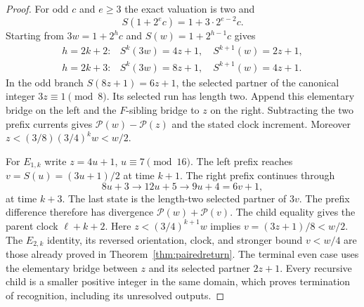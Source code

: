 \documentclass[11pt]{article}
\begin{document}
\begin{proof}
For odd $c$ and $e\ge3$ the exact valuation is two and
\[
S(1+2^ec)=1+3\cdot2^{e-2}c.
\]
Starting from $3w=1+2^h c$ and $S(w)=1+2^{h-1}c$ gives
\[
\begin{array}{ll}
h=2k+2:& S^k(3w)=4z+1,\quad S^{k+1}(w)=2z+1,\\
h=2k+3:& S^k(3w)=8z+1,\quad S^{k+1}(w)=4z+1.
\end{array}
\]
In the odd branch $S(8z+1)=6z+1$, the selected partner of the
canonical integer $3z\equiv1\pmod8$. Its selected run has length
two. Append this elementary bridge on the left and the $F$-sibling
bridge to $z$ on the right. Subtracting the two prefix currents gives
$\mathcal P(w)-\mathcal P(z)$ and the stated clock increment.
Moreover
$z<(3/8)(3/4)^k w<w/2$.

For $E_{1,k}$ write $z=4u+1$, $u\equiv7\pmod{16}$.
The left prefix reaches $v=S(u)=(3u+1)/2$ at time $k+1$.
The right prefix continues through
\[
8u+3\longrightarrow12u+5\longrightarrow9u+4=6v+1,
\]
at time $k+3$. The last state is the length-two selected partner
of $3v$. The prefix difference therefore has divergence
$\mathcal P(w)+\mathcal P(v)$. The child equality gives the parent
clock $\ell+k+2$. Here $z<(3/4)^{k+1}w$ implies
$v=(3z+1)/8<w/2$. The $E_{2,k}$ identity, its reversed orientation,
clock, and stronger bound $v<w/4$ are those already proved in
Theorem~\ref{thm:pairedreturn}. The terminal even case uses the
elementary bridge between $z$ and its selected partner $2z+1$.
Every recursive child is a smaller positive integer in the same domain,
which proves termination of recognition, including its unresolved outputs.
\end{proof}
\end{document}
